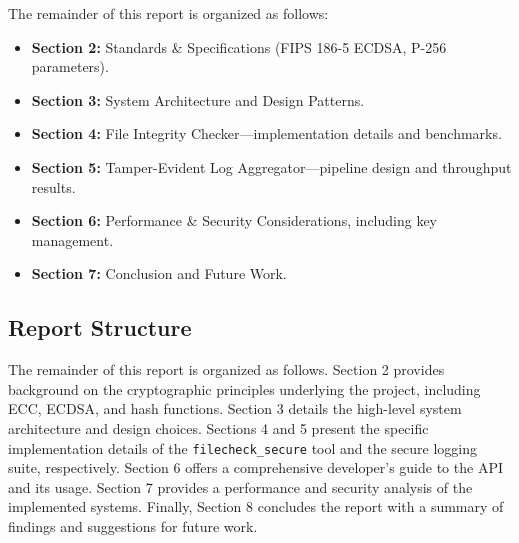 The remainder of this report is organized as follows:

\begin{itemize}
	\item \textbf{Section 2:} Standards \& Specifications (FIPS 186-5 ECDSA, P-256 parameters).  
	\item \textbf{Section 3:} System Architecture and Design Patterns.  
	\item \textbf{Section 4:} File Integrity Checker—implementation details and benchmarks.  
	\item \textbf{Section 5:} Tamper-Evident Log Aggregator—pipeline design and throughput results.  
	\item \textbf{Section 6:} Performance \& Security Considerations, including key management.  
	\item \textbf{Section 7:} Conclusion and Future Work.  
\end{itemize}

\subsection{Report Structure}
The remainder of this report is organized as follows. Section 2 provides background on the cryptographic principles underlying the project, including ECC, ECDSA, and hash functions. Section 3 details the high-level system architecture and design choices. Sections 4 and 5 present the specific implementation details of the \texttt{filecheck\_secure} tool and the secure logging suite, respectively. Section 6 offers a comprehensive developer's guide to the API and its usage. Section 7 provides a performance and security analysis of the implemented systems. Finally, Section 8 concludes the report with a summary of findings and suggestions for future work.

\newpage
